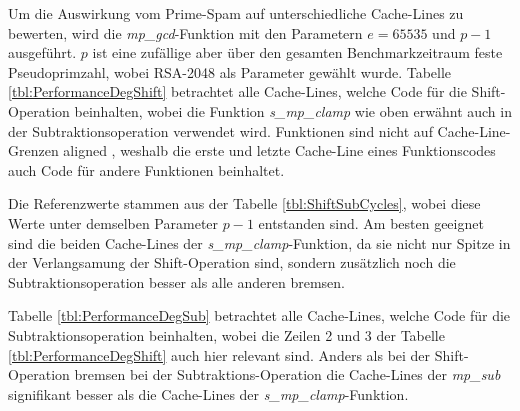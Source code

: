 Um die Auswirkung vom Prime-Spam auf unterschiedliche Cache-Lines zu bewerten, wird die \textit{mp_gcd}-Funktion mit den Parametern $e=65535$ und $p-1$ ausgeführt.
$p$ ist eine zufällige aber über den gesamten Benchmarkzeitraum feste Pseudoprimzahl, wobei RSA-2048 als Parameter gewählt wurde.
Tabelle \ref{tbl:PerformanceDegShift} betrachtet alle Cache-Lines, welche Code für die Shift-Operation beinhalten, wobei die Funktion \textit{s_mp_clamp} wie oben erwähnt auch in der Subtraktionsoperation verwendet wird.
Funktionen sind nicht auf Cache-Line-Grenzen aligned
, weshalb die erste und letzte Cache-Line eines Funktionscodes auch Code für andere Funktionen beinhaltet.

Die Referenzwerte stammen aus der Tabelle \ref{tbl:ShiftSubCycles}, wobei diese Werte unter demselben Parameter $p-1$ entstanden sind.
Am besten geeignet sind die beiden Cache-Lines der \textit{s_mp_clamp}-Funktion, da sie nicht nur Spitze in der Verlangsamung der Shift-Operation sind, sondern zusätzlich noch die Subtraktionsoperation besser als alle anderen bremsen.

Tabelle \ref{tbl:PerformanceDegSub} betrachtet alle Cache-Lines, welche Code für die Subtraktionsoperation beinhalten, wobei die Zeilen 2 und 3 der Tabelle \ref{tbl:PerformanceDegShift} auch hier relevant sind.
Anders als bei der Shift-Operation bremsen bei der Subtraktions-Operation die Cache-Lines der \textit{mp_sub} signifikant besser als die Cache-Lines der \textit{s_mp_clamp}-Funktion.

